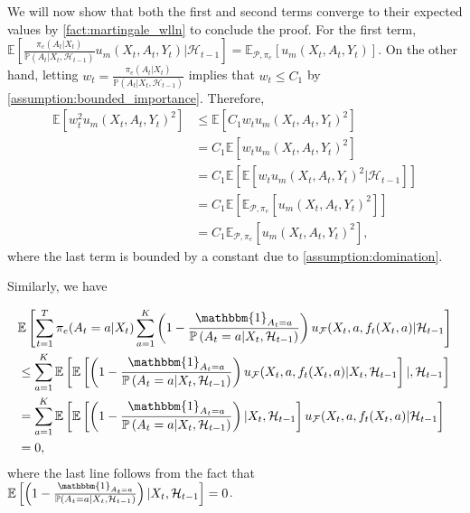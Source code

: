 \documentclass[11pt]{article}
\newcommand{\E}{\mathbb{E}}
\begin{document}
\begin{appendix}
We will now show that both the first and second terms converge to their expected values by \cref{fact:martingale_wlln} to conclude the proof. For the first term, 
$ \E\left[\frac{\pi_{e}(A_{t} | X_{t})}{\mathbb{P} \left(A_{t} | X_{t},\mathcal{H}_{t-1} \right) }
u_{m}(X_{t},A_{t},Y_{t}) |\mathcal{H}_{t-1}\right] =  \E_{\mathcal{P},\pi_{e}}\left[u_{m}(X_t,A_t,Y_t)\right]$. On the other hand, letting $w_{t} = \frac{\pi_{e}(A_{t} | X_{t})}{\mathbb{P} \left(A_{t} | X_{t},\mathcal{H}_{t-1} \right) }$ implies that $w_{t} \le C_{1}$ by \cref{assumption:bounded_importance}. Therefore, 
\begin{align*}
    \mathbb{E}[w_{t}^{2} u_{m}(X_t,A_t,Y_t)^{2}] &\le \mathbb{E}[C_{1} w_{t} u_{m}(X_t,A_t,Y_t)^{2}] \\
    &= C_{1}\mathbb{E}[ w_{t} u_{m}(X_t,A_t,Y_t)^{2}]\\
    &= C_{1} \mathbb{E}[\mathbb{E}[ w_{t} u_{m}(X_t,A_t,Y_t)^{2} |\mathcal{H}_{t-1}]] \\
    &= C_{1} \mathbb{E}[\mathbb{E}_{\mathcal{P},\pi_e}[ u_{m}(X_t,A_t,Y_t)^{2}]] \\
    &= C_{1} \mathbb{E}_{\mathcal{P},\pi_e}[ u_{m}(X_t,A_t,Y_t)^{2}],
\end{align*}
where the last term is bounded by a constant due to \cref{assumption:domination}.

Similarly, we have 

\begin{align*}
    &\E\left[\sum_{t=1}^{T} \pi_{e}(A_{t} =a | X_{t})  \sum_{a=1}^{K} \left(1 - \frac{\mathbbm{1}_{A_{t} = a} }{\mathbb{P} \left(A_{t} =a | X_{t},\mathcal{H}_{t-1} \right)}\right) u_{\mathcal{F}}(X_{t},a,f_{t}(X_{t},a)|\mathcal{H}_{t-1}\right] \\
    &\le \sum_{a=1}^{K} \E\left[ \E \left[\left(1 - \frac{\mathbbm{1}_{A_{t} = a} }{\mathbb{P} \left(A_{t} =a | X_{t},\mathcal{H}_{t-1} \right)}\right) u_{\mathcal{F}}(X_{t},a,f_{t}(X_{t},a) |X_t, \mathcal{H}_{t-1} \right]|, \mathcal{H}_{t-1} \right]\\
    &= \sum_{a=1}^{K} \E\left[ \E \left[\left(1 - \frac{\mathbbm{1}_{A_{t} = a} }{\mathbb{P} \left(A_{t} =a | X_{t},\mathcal{H}_{t-1} \right)}\right) |X_t, \mathcal{H}_{t-1} \right] u_{\mathcal{F}}(X_{t},a,f_{t}(X_{t},a) | \mathcal{H}_{t-1} \right]\\
    &= 0,
\end{align*}
where the last line follows from the fact that  $\E \left[\left(1 - \frac{\mathbbm{1}_{A_{t} = a} }{\mathbb{P} \left(A_{t} =a | X_{t},\mathcal{H}_{t-1} \right)}\right) |X_t, \mathcal{H}_{t-1} \right] = 0$.


\end{appendix}
\end{document}
